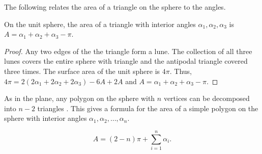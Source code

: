 The following relates the area of a triangle on the sphere to the angles.

\begin{lemma}\label{lem:spherical-triangle}
On the unit sphere, the area of a triangle with interior angles $\alpha_1, \alpha_2, \alpha_3$
is $A=\alpha_1+\alpha_2+\alpha_3-\pi$.
\end{lemma}

\begin{proof}
	Any two edges of the the triangle form a lune. The collection of 
	all three lunes covers the entire sphere with triangle and the antipodal triangle covered three times.
 	The surface area of the unit sphere is $4\pi$.
	Thus, $4\pi=2(2\alpha_1+2\alpha_2+2\alpha_3)-6A+2A$
	and $A=\alpha_1+\alpha_2+\alpha_3-\pi$.
\end{proof}

As in the plane, any polygon on the sphere with $n$ vertices can be decomposed
into $n-2$ triangles \cite{orourke_computational_1994}. This gives a formula for the area of a simple polygon
on the sphere with interior angles $\alpha_1,\alpha_2,\ldots, \alpha_n$.

\begin{equation} \label{eqn:sphere-area}
	A=(2-n)\pi +\sum_{i=1}^n \alpha_i.
\end{equation}





